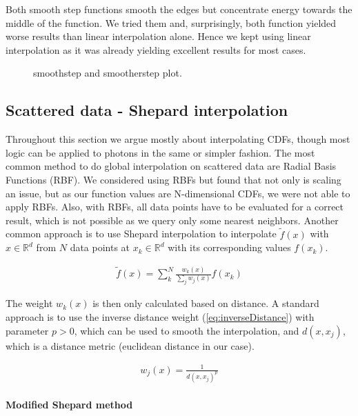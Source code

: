 Both smooth step functions smooth the edges but concentrate energy towards the middle of the function. We tried them and, surprisingly, both function yielded worse results than linear interpolation alone. Hence we kept using linear interpolation as it was already yielding excellent results for most cases.

\begin{figure}[htbp] 
	\centering
	\tiny
    
    \caption{smoothstep and smootherstep plot. } 
    \label{fig:smoothstep}
\end{figure}

\subsection{Scattered data - Shepard interpolation}
\label{ch:unstructured}

Throughout this section we argue mostly about interpolating CDFs, though most logic can be applied to photons in the same or simpler fashion. The most common method to do global interpolation on scattered data are Radial Basis Functions (RBF). We considered using RBFs but found that not only is scaling an issue, but as our function values are N-dimensional CDFs, we were not able to apply RBFs. Also, with RBFs, all data points have to be evaluated for a correct result, which is not possible as we query only some nearest neighbors. Another common approach is to use Shepard interpolation to interpolate $\widetilde{f}(x)$ with $x \in \mathbb{R}^d$ from $N$ data points at $x_k \in \mathbb{R}^d$ with its corresponding values $f(x_k)$. 

\begin{align}\label{eq:shepard}
\widetilde{f}(x) = \sum_{k}^{N}\frac{w_k(x)}{\sum\nolimits_{j}w_j(x)}f(x_k)
\end{align}

The weight $w_k(x)$ is then only calculated based on distance. A standard approach is to use the inverse distance weight (\ref{eq:inverseDistance}) with parameter $p > 0$, which can be used to smooth the interpolation, and $d(x, x_j)$, which is a distance metric (euclidean distance in our case).

\begin{align}\label{eq:inverseDistance}
w_j(x) = \frac{1}{d(x, x_j)^p}
\end{align}


\paragraph{Modified Shepard method}
\label{ch:modshep}


